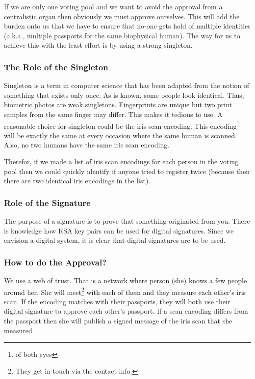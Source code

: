 \documentclass{article}
\theoremstyle{definition}
\begin{document}
	If we are only one voting pool and we want to avoid the approval from a centralistic organ then obviously we must approve ourselves. This will add the burden onto us that we have to ensure that no-one gets hold of multiple identities (a.k.a., multiple passports for the same biophysical human). The way for us to achieve this with the least effort is by using a strong singleton.
	
	\subsubsection{The Role of the Singleton}
	Singleton is a term in computer science that has been adapted from the notion of something that exists only once.
	As is known, some people look identical. Thus, biometric photos are weak singletons. Fingerprints are unique but two print samples from the same finger may differ. This makes it tedious to use. A reasonable choice for singleton could be the iris scan encoding. This encoding\footnote{of both eyes} will be exactly the same at every occasion where the same human is scanned. Also, no two humans have the same iris scan encoding.
	
	Therefor, if we made a list of iris scan encodings for each person in the voting pool then we could quickly identify if anyone tried to register twice (because then there are two identical iris encodings in the list).
	
	\subsubsection{Role of the Signature}
	The purpose of a signature is to prove that something originated from you. There is knowledge how RSA key pairs can be used for digital signatures. Since we envision a digital system, it is clear that digital signatures are to be used.
	
	\subsubsection{How to do the Approval?}
	We use a web of trust. That is a network where person (she) knows a few people around her. She will meet\footnote{They get in touch via the contact info.} with each of them and they measure each other's iris scan. If the encoding matches with their passports, they will both use their digital signature to approve each other's passport. If a scan encoding differs from the passport then she will publish a signed message of the iris scan that she measured.
	
\end{document}
